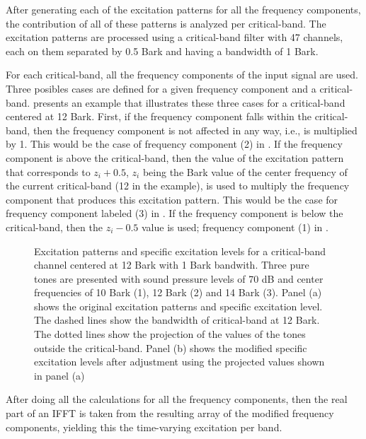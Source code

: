 \documentclass[../main.tex]{subfiles}
\begin{document}
\begin{modelchapter}
After generating each of the excitation patterns for all the frequency
components, the contribution of all of these patterns is analyzed per
critical-band. The excitation patterns are processed using a critical-band
filter with 47 channels, each on them separated by 0.5 Bark and having a
bandwidth of 1 Bark.

For each critical-band, all the frequency components of the input signal are
used. Three posibles cases are defined for a given frequency component and a
critical-band.  presents an example that illustrates these
three cases for a critical-band centered at 12 Bark. First, if the frequency
component falls within the critical-band, then the frequency component is not
affected in any way, i.e., is multiplied by 1. This would be the case of
frequency component (2) in . If the frequency component is
above the critical-band, then the value of the excitation pattern that
corresponds to $z_i + 0.5$, $z_i$ being the Bark value of the center frequency
of the current critical-band (12 in the example), is used to multiply the
frequency component that produces this excitation pattern. This would be the
case for frequency component labeled (3) in . If the
frequency component is below the critical-band, then the $z_i - 0.5$ value is
used; frequency component (1) in .

\begin{figure}[!ht]
  \centering
  
  
  \caption{Excitation patterns and specific excitation levels for a
    critical-band channel centered at 12 Bark with 1 Bark bandwith. Three pure
    tones are presented with sound pressure levels of 70 dB and center
    frequencies of 10 Bark (1), 12 Bark (2) and 14 Bark (3). Panel (a) shows the
    original excitation patterns and specific excitation level. The dashed lines
    show the bandwidth of critical-band at 12 Bark. The dotted lines show the
    projection of the values of the tones outside the critical-band. Panel (b)
    shows the modified specific excitation levels after adjustment using the
    projected values shown in panel (a)}
\label{fig:schrader}
\end{figure}

After doing all the calculations for all the frequency components, then the real
part of an \gls{IFFT} is taken from the resulting array of the modified
frequency components, yielding this the time-varying excitation per band.


\end{modelchapter}
\end{document}
